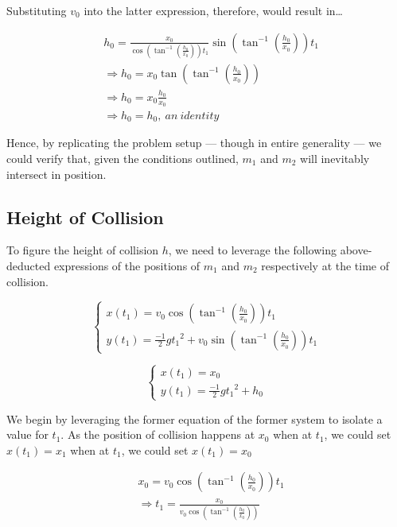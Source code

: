 \documentclass[letterpaper]{article}
\begin{document}
Substituting \(v_0\) into the latter expression, therefore, would result in\ldots{}

\begin{align}
& h_0 = \frac{x_0}{\cos(\tan^{-1}(\frac{h_0}{x_0}))t_1}\sin(\tan^{-1}(\frac{h_0}{x_0})) t_1 \\
& \Rightarrow h_0 = x_0 \tan(\tan^{-1}(\frac{h_0}{x_0})) \\
& \Rightarrow h_0 = x_0 \frac{h_0}{x_0} \\
& \Rightarrow h_0 = h_0,\ an\ identity
\end{align}

Hence, by replicating the problem setup --- though in entire generality --- we could verify that, given the conditions outlined, \(m_1\) and \(m_2\) will inevitably intersect in position.

\subsection{Height of Collision}
\label{sec:org952c9a3}

To figure the height of collision \(h\), we need to leverage the following above-deducted expressions of the positions of \(m_1\) and \(m_2\) respectively at the time of collision.

\begin{equation}
    \begin{cases}
        x(t_1) = v_0\cos(\tan^{-1}(\frac{h_0}{x_0}))t_1 \\
        y(t_1) = \frac{-1}{2}g {t_1}^2 + v_0\sin(\tan^{-1}(\frac{h_0}{x_0})) t_1
    \end{cases}
\end{equation}

\begin{equation}
    \begin{cases}
        x(t_1) = x_0 \\
        y(t_1) = \frac{-1}{2}g{t_1}^2 + h_0
    \end{cases}
\end{equation}

We begin by leveraging the former equation of the former system to isolate a value for \(t_1\). As the position of collision happens at \(x_0\) when at \(t_1\), we could set \(x(t_1) = x_1\) when at \(t_1\), we could set \(x(t_1) = x_0\)

\begin{align}
    & x_0 = v_0\cos(\tan^{-1}(\frac{h_0}{x_0}))t_1 \\
    & \Rightarrow t_1 = \frac{x_0}{v_0\cos(\tan^{-1}(\frac{h_0}{x_0}))}
\end{align}
\end{document}
